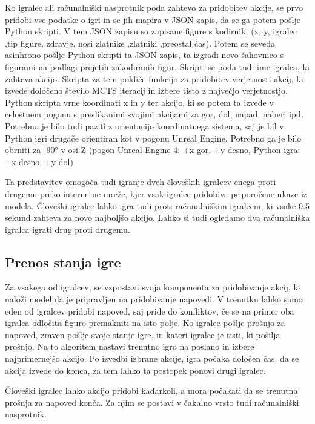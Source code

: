 \documentclass[a4paper, 12pt]{book}
\begin{document}
Ko igralec ali računalniški nasprotnik poda zahtevo za pridobitev akcije, se prvo pridobi vse podatke o igri in se jih mapira v JSON zapis, da se ga potem pošlje Python skripti.
V tem JSON zapisu so zapisane figure s kodirniki (x, y, igralec ,tip figure, zdravje, nosi zlatnike ,zlatniki ,preostal čas).
Potem se seveda asinhrono pošlje Python skripti ta JSON zapis, ta izgradi novo šahovnico s figurami na podlagi prejetih zakodiranih figur.
Skripti se poda tudi ime igralca, ki zahteva akcijo.
Skripta za tem pokliče funkcijo za pridobitev verjetnosti akcij, ki izvede določeno število MCTS iteracij in izbere tisto z največjo verjetnostjo.
Python skripta vrne koordinati x in y ter akcijo, ki se potem ta izvede v celostnem pogonu s preslikanimi svojimi akcijami za gor, dol, napad, naberi ipd.
Potrebno je bilo tudi paziti z orientacijo koordinatnega sistema, saj je bil v Python igri drugače orientiran kot v pogonu Unreal Engine. 
Potrebno ga je bilo obrniti za -90° v osi Z (pogon Unreal Engine 4: +x gor, +y desno, Python igra: +x desno, +y dol)

Ta predstavitev omogoča tudi igranje dveh človeških igralcev enega proti drugemu preko internetne mreže, kjer vsak igralec pridobiva priporočene ukaze iz modela.
Človeški igralec lahko igra tudi proti računalniškim igralcem, ki vsake 0.5 sekund zahteva za novo najboljšo akcijo.
Lahko si tudi ogledamo dva računalniška igralca igrati drug proti drugemu.

\subsection{Prenos stanja igre}
Za vsakega od igralcev, se vzpostavi svoja komponenta za pridobivanje akcij, ki naloži model da je pripravljen na pridobivanje napovedi.
V trenutku lahko samo eden od igralcev pridobi napoved, saj pride do konfliktov, če se na primer oba igralca odločita figuro premakniti na isto polje.
Ko igralec pošlje prošnjo za napoved, zraven pošlje svoje stanje igre, in kateri igralec je tisti, ki pošilja prošnjo.
Na to algoritem nastavi trenutno igro na poslano in izbere najprimernejšo akcijo.
Po izvedbi izbrane akcije, igra počaka določen čas, da se akcija izvede do konca, za tem lahko ta postopek ponovi drugi igralec.

Človeški igralec lahko akcijo pridobi kadarkoli, a mora počakati da se trenutna prošnja za napoved konča. Za njim se postavi v čakalno vrsto tudi računalniški nasprotnik.

\end{document}
